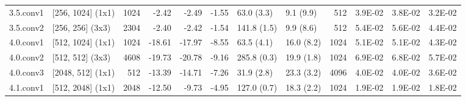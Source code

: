 \begin{table}
\begin{tabular}{llrrrrllrrrr}
3.5.conv1 & [256, 1024] (1x1) & 1024 & {\cellcolor[HTML]{FFFDBC}} \color[HTML]{000000} -2.42 & {\cellcolor[HTML]{FFFCBA}} \color[HTML]{000000} -2.49 & {\cellcolor[HTML]{F8FCB6}} \color[HTML]{000000} -1.55 & 63.0 (3.3) & 9.1 (9.9) & 512 & {\cellcolor[HTML]{FDBB6C}} \color[HTML]{000000} 3.9E-02 & {\cellcolor[HTML]{FDC171}} \color[HTML]{000000} 3.8E-02 & {\cellcolor[HTML]{FEE18D}} \color[HTML]{000000} 3.2E-02 \\
3.5.conv2 & [256, 256] (3x3) & 2304 & {\cellcolor[HTML]{FFFDBC}} \color[HTML]{000000} -2.40 & {\cellcolor[HTML]{FFFDBC}} \color[HTML]{000000} -2.42 & {\cellcolor[HTML]{F8FCB6}} \color[HTML]{000000} -1.54 & 141.8 (1.5) & 9.9 (8.6) & 512 & {\cellcolor[HTML]{E75337}} \color[HTML]{F1F1F1} 5.4E-02 & {\cellcolor[HTML]{E24731}} \color[HTML]{F1F1F1} 5.6E-02 & {\cellcolor[HTML]{FB9D59}} \color[HTML]{000000} 4.4E-02 \\
4.0.conv1 & [512, 1024] (1x1) & 1024 & {\cellcolor[HTML]{C01A27}} \color[HTML]{F1F1F1} -18.61 & {\cellcolor[HTML]{CA2427}} \color[HTML]{F1F1F1} -17.97 & {\cellcolor[HTML]{FDBD6D}} \color[HTML]{000000} -8.55 & 63.5 (4.1) & 16.0 (8.2) & 1024 & {\cellcolor[HTML]{F36B42}} \color[HTML]{F1F1F1} 5.1E-02 & {\cellcolor[HTML]{F36B42}} \color[HTML]{F1F1F1} 5.1E-02 & {\cellcolor[HTML]{FBA05B}} \color[HTML]{000000} 4.3E-02 \\
4.0.conv2 & [512, 512] (3x3) & 4608 & {\cellcolor[HTML]{B30D26}} \color[HTML]{F1F1F1} -19.73 & {\cellcolor[HTML]{A50026}} \color[HTML]{F1F1F1} -20.78 & {\cellcolor[HTML]{FDB365}} \color[HTML]{000000} -9.16 & 285.8 (0.3) & 19.9 (1.8) & 1024 & {\cellcolor[HTML]{A50026}} \color[HTML]{F1F1F1} 6.9E-02 & {\cellcolor[HTML]{A50026}} \color[HTML]{F1F1F1} 6.8E-02 & {\cellcolor[HTML]{DE402E}} \color[HTML]{F1F1F1} 5.7E-02 \\
4.0.conv3 & [2048, 512] (1x1) & 512 & {\cellcolor[HTML]{F36B42}} \color[HTML]{F1F1F1} -13.39 & {\cellcolor[HTML]{E95538}} \color[HTML]{F1F1F1} -14.71 & {\cellcolor[HTML]{FECC7B}} \color[HTML]{000000} -7.26 & 31.9 (2.8) & 23.3 (3.2) & 4096 & {\cellcolor[HTML]{FDB567}} \color[HTML]{000000} 4.0E-02 & {\cellcolor[HTML]{FDB567}} \color[HTML]{000000} 4.0E-02 & {\cellcolor[HTML]{FECC7B}} \color[HTML]{000000} 3.6E-02 \\
4.1.conv1 & [512, 2048] (1x1) & 2048 & {\cellcolor[HTML]{F67A49}} \color[HTML]{F1F1F1} -12.50 & {\cellcolor[HTML]{FCAA5F}} \color[HTML]{000000} -9.73 & {\cellcolor[HTML]{FEE797}} \color[HTML]{000000} -4.95 & 127.0 (0.7) & 18.3 (2.2) & 1024 & {\cellcolor[HTML]{EBF7A3}} \color[HTML]{000000} 1.9E-02 & {\cellcolor[HTML]{EBF7A3}} \color[HTML]{000000} 1.9E-02 & {\cellcolor[HTML]{E8F59F}} \color[HTML]{000000} 1.8E-02 \\

\end{tabular}
\end{table}
